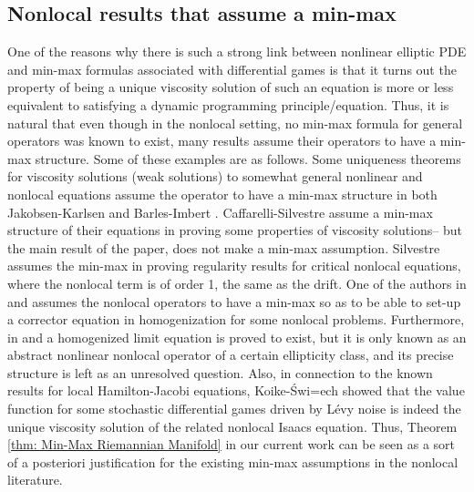 \documentclass[11pt,reqno]{amsart}
\numberwithin{equation}{section}
\theoremstyle{plain}
\def\polhk#1{\setbox0=\hbox{#1}{\ooalign{\hidewidth
	    \lower1.5ex\hbox{`}\hidewidth\crcr\unhbox0}}}
\begin{document}

\subsection{Nonlocal results that assume a min-max}\label{sec:ExamplesAssumeMinMaxNonlocal}
One of the reasons why there is such a strong link between nonlinear elliptic PDE and min-max formulas associated with differential games is that it turns out the property of being a unique viscosity solution of such an equation is more or less equivalent to satisfying a dynamic programming principle/equation.  Thus, it is natural that even though in the nonlocal setting, no min-max formula for general operators was known to exist, many results assume their operators to have a min-max structure.  Some of these examples are as follows.  Some uniqueness theorems for viscosity solutions (weak solutions) to somewhat general nonlinear and nonlocal equations assume the operator to have a min-max structure in both Jakobsen-Karlsen \cite{JakobsenKarlsen-2006maxpple} and Barles-Imbert \cite{BaIm-07}. Caffarelli-Silvestre \cite[Sections 3 and 4]{CaSi-09RegularityIntegroDiff} assume a min-max structure of their equations in proving some properties of viscosity solutions-- but the main result of the paper, \cite{CaSi-09RegularityIntegroDiff} does not make a min-max assumption.  Silvestre \cite{Silv-2011DifferentiabilityCriticalHJ} assumes the min-max in proving regularity results for critical nonlocal equations, where the nonlocal term is of order 1, the same as the drift.  One of the authors in \cite{Schw-10Per} and \cite{Schw-12StochCPDE} assumes the nonlocal operators to have a min-max so as to be able to set-up a corrector equation in homogenization for some nonlocal problems.  Furthermore, in \cite{Schw-10Per} and \cite{Schw-12StochCPDE} a homogenized limit equation is proved to exist, but it is only known as an abstract nonlinear nonlocal operator of a certain ellipticity class, and its precise structure is left as an unresolved question.  Also, in connection to the known results for local Hamilton-Jacobi equations, Koike-{\'S}wi{\polhk{e}}ch \cite{KoikeSwiech-2013RepFormulaIntegroPDE-IUMJ} showed that the value function for some stochastic differential games driven by L\'evy noise is indeed the unique viscosity solution of the related nonlocal Isaacs equation. Thus, Theorem \ref{thm: Min-Max Riemannian Manifold} in our current work can be seen as a sort of a posteriori justification for the existing min-max assumptions in the nonlocal literature.
\end{document}
